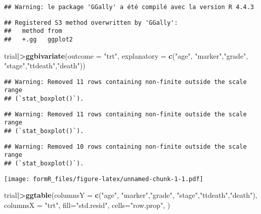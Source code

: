 \documentclass[
]{article}
\newenvironment{Shaded}{\begin{snugshade}}{\end{snugshade}}
\newcommand{\AttributeTok}[1]{\textcolor[rgb]{0.13,0.29,0.53}{#1}}
\newcommand{\FunctionTok}[1]{\textcolor[rgb]{0.13,0.29,0.53}{\textbf{#1}}}
\newcommand{\NormalTok}[1]{#1}
\newcommand{\SpecialCharTok}[1]{\textcolor[rgb]{0.81,0.36,0.00}{\textbf{#1}}}
\newcommand{\StringTok}[1]{\textcolor[rgb]{0.31,0.60,0.02}{#1}}
\begin{document}
\begin{verbatim}
## Warning: le package 'GGally' a été compilé avec la version R 4.4.3
\end{verbatim}

\begin{verbatim}
## Registered S3 method overwritten by 'GGally':
##   method from   
##   +.gg   ggplot2
\end{verbatim}

\begin{Shaded}
\begin{Highlighting}[]
\NormalTok{trial}\SpecialCharTok{|\textgreater{}}\FunctionTok{ggbivariate}\NormalTok{(}\AttributeTok{outcome =} \StringTok{"trt"}\NormalTok{, }\AttributeTok{explanatory =} \FunctionTok{c}\NormalTok{(}\StringTok{"age"}\NormalTok{, }\StringTok{"marker"}\NormalTok{,}\StringTok{"grade"}\NormalTok{, }\StringTok{"stage"}\NormalTok{,}\StringTok{"ttdeath"}\NormalTok{,}\StringTok{"death"}\NormalTok{))}
\end{Highlighting}
\end{Shaded}

\begin{verbatim}
## Warning: Removed 11 rows containing non-finite outside the scale range
## (`stat_boxplot()`).
\end{verbatim}

\begin{verbatim}
## Warning: Removed 11 rows containing non-finite outside the scale range
## (`stat_boxplot()`).
\end{verbatim}

\begin{verbatim}
## Warning: Removed 10 rows containing non-finite outside the scale range
## (`stat_boxplot()`).
\end{verbatim}

\texttt{[image: formR\_files/figure-latex/unnamed-chunk-1-1.pdf]}

\begin{Shaded}
\begin{Highlighting}[]
\NormalTok{trial}\SpecialCharTok{|\textgreater{}}\FunctionTok{ggtable}\NormalTok{(}\AttributeTok{columnsY =} \FunctionTok{c}\NormalTok{(}\StringTok{"age"}\NormalTok{, }\StringTok{"marker"}\NormalTok{,}\StringTok{"grade"}\NormalTok{, }\StringTok{"stage"}\NormalTok{,}\StringTok{"ttdeath"}\NormalTok{,}\StringTok{"death"}\NormalTok{), }\AttributeTok{columnsX =} \StringTok{"trt"}\NormalTok{,}
               \AttributeTok{fill=}\StringTok{"std.resid"}\NormalTok{,}
               \AttributeTok{cells=}\StringTok{"row.prop"}\NormalTok{,}
\NormalTok{               )}
\end{Highlighting}
\end{Shaded}
\end{document}
